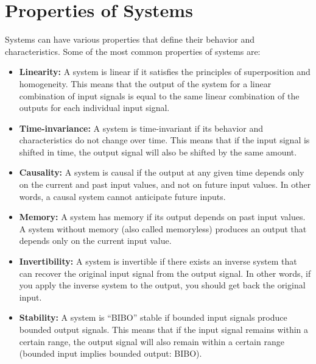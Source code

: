 \documentclass{ee102_notes}
\begin{document}
\section{Properties of Systems}
Systems can have various properties that define their behavior and characteristics. Some of the most common properties of systems are:
\begin{itemize}
    \item \textbf{Linearity:} A system is linear if it satisfies the principles of superposition and homogeneity. This means that the output of the system for a linear combination of input signals is equal to the same linear combination of the outputs for each individual input signal.
    \item \textbf{Time-invariance:} A system is time-invariant if its behavior and characteristics do not change over time. This means that if the input signal is shifted in time, the output signal will also be shifted by the same amount.
    \item \textbf{Causality:} A system is causal if the output at any given time depends only on the current and past input values, and not on future input values. In other words, a causal system cannot anticipate future inputs.
    \item \textbf{Memory:} A system has memory if its output depends on past input values. A system without memory (also called memoryless) produces an output that depends only on the current input value.
    \item \textbf{Invertibility:} A system is invertible if there exists an inverse system that can recover the original input signal from the output signal. In other words, if you apply the inverse system to the output, you should get back the original input.
    \item \textbf{Stability:} A system is ``BIBO'' stable if bounded input signals produce bounded output signals. This means that if the input signal remains within a certain range, the output signal will also remain within a certain range (bounded input implies bounded output: BIBO).
\end{itemize}
\end{document}

